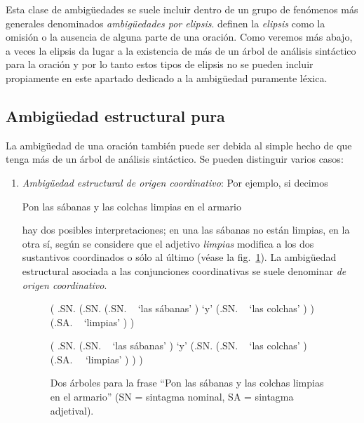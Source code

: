 \begin{enumerate}
Esta clase de ambigüedades se suele incluir dentro de un grupo de fenómenos más generales denominados \emph{ambigüedades por elipsis}. \citet{alcaraz97b} definen la \emph{elipsis}\label{pg:ellipsi} como la omisión o la ausencia de alguna parte de una oración. Como veremos más abajo, a veces la elipsis da lugar a la existencia de más de un árbol de análisis sintáctico para la oración y por lo tanto estos tipos de elipsis no se pueden incluir propiamente en este apartado dedicado a la ambigüedad puramente léxica. \end{enumerate} 

\subsection{Ambigüedad estructural pura} \label{ss:ambest} La ambigüedad de una oración también puede ser debida al simple hecho de que tenga más de un árbol de análisis sintáctico. Se pueden distinguir varios casos: \begin{enumerate} \item \emph{Ambigüedad estructural de origen coordinativo}: Por ejemplo, si decimos \begin{exemple} Pon las sábanas y las colchas limpias en el armario \end{exemple} hay dos posibles interpretaciones; en una las sábanas no están limpias, en la otra sí, según se considere que el adjetivo \emph{limpias} modifica a los dos sustantivos coordinados o sólo al último (véase la fig.~\ref{fg:cobertors}). La ambigüedad estructural asociada a las conjunciones coordinativas se suele denominar \emph{de origen coordinativo}. 

\begin{figure} \begin{center} \begin{parsetree} ( .SN. (.SN. (.SN. ~ `las sábanas' ) `y' (.SN. ~ `las colchas' ) ) (.SA. ~ `limpias' ) ) \end{parsetree} \end{center} \begin{center} \begin{parsetree} ( .SN. (.SN. ~ `las sábanas' ) `y' (.SN. (.SN. ~ `las colchas' ) (.SA. ~~`limpias' ) ) ) \end{parsetree} \end{center} \caption{Dos árboles para la frase ``Pon las sábanas y las colchas limpias en el armario'' (SN = sintagma nominal, SA = sintagma adjetival).} \label{fg:cobertors} \end{figure} 


\end{enumerate}
